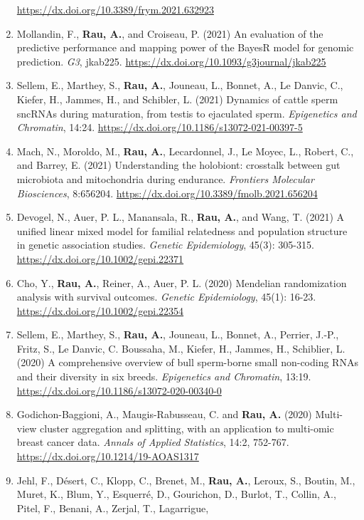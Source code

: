 \documentclass[11pt, a4paper]{awesome-cv}
\begin{document}
\begin{enumerate}
  \url{https://dx.doi.org/10.3389/frym.2021.632923}
\item
  Mollandin, F., \textbf{Rau, A.}, and Croiseau, P. (2021) An evaluation
  of the predictive performance and mapping power of the BayesR model
  for genomic prediction. \emph{G3}, jkab225.
  \url{https://dx.doi.org/10.1093/g3journal/jkab225}
\item
  Sellem, E., Marthey, S., \textbf{Rau, A.}, Jouneau, L., Bonnet, A., Le
  Danvic, C., Kiefer, H., Jammes, H., and Schibler, L. (2021) Dynamics
  of cattle sperm sncRNAs during maturation, from testis to ejaculated
  sperm. \emph{Epigenetics and Chromatin}, 14:24.
  \url{https://dx.doi.org/10.1186/s13072-021-00397-5}
\item
  Mach, N., Moroldo, M., \textbf{Rau, A.}, Lecardonnel, J., Le Moyec,
  L., Robert, C., and Barrey, E. (2021) Understanding the holobiont:
  crosstalk between gut microbiota and mitochondria during endurance.
  \emph{Frontiers Molecular Biosciences}, 8:656204.
  \url{https://dx.doi.org/10.3389/fmolb.2021.656204}
\item
  Devogel, N., Auer, P. L., Manansala, R., \textbf{Rau, A.}, and Wang,
  T. (2021) A unified linear mixed model for familial relatedness and
  population structure in genetic association studies. \emph{Genetic
  Epidemiology}, 45(3): 305-315.
  \url{https://dx.doi.org/10.1002/gepi.22371}
\item
  Cho, Y., \textbf{Rau, A.}, Reiner, A., Auer, P. L. (2020) Mendelian
  randomization analysis with survival outcomes. \emph{Genetic
  Epidemiology}, 45(1): 16-23.
  \url{https://dx.doi.org/10.1002/gepi.22354}
\item
  Sellem, E., Marthey, S., \textbf{Rau, A.}, Jouneau, L., Bonnet, A.,
  Perrier, J.-P., Fritz, S., Le Danvic, C. Boussaha, M., Kiefer, H.,
  Jammes, H., Schiblier, L. (2020) A comprehensive overview of bull
  sperm-borne small non-coding RNAs and their diversity in six breeds.
  \emph{Epigenetics and Chromatin}, 13:19.
  \url{https://dx.doi.org/10.1186/s13072-020-00340-0}
\item
  Godichon-Baggioni, A., Maugis-Rabusseau, C. and \textbf{Rau, A.}
  (2020) Multi-view cluster aggregation and splitting, with an
  application to multi-omic breast cancer data. \emph{Annals of Applied
  Statistics}, 14:2, 752-767.
  \url{https://dx.doi.org/10.1214/19-AOAS1317}
\item
  Jehl, F., Désert, C., Klopp, C., Brenet, M., \textbf{Rau, A.}, Leroux,
  S., Boutin, M., Muret, K., Blum, Y., Esquerré, D., Gourichon, D.,
  Burlot, T., Collin, A., Pitel, F., Benani, A., Zerjal, T., Lagarrigue,

\end{enumerate}
\end{document}
